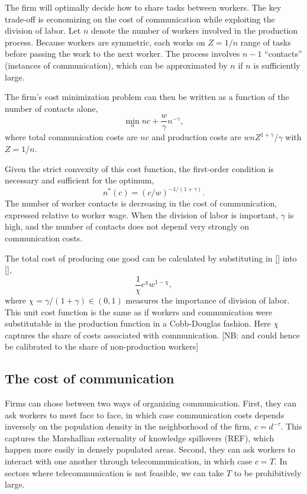 \documentclass[10pt,letterpaper]{article}
\begin{document}
The firm will optimally decide how to share tasks between workers. The key trade-off is economizing on the cost of communication while exploiting the division of labor. Let $n$ denote the number of workers involved in the production process. Because workers are symmetric, each works on $Z=1/n$ range of tasks before passing the work to the next worker. The process involves $n-1$ ``contacts'' (instances of communication), which can be approximated by $n$ if $n$ is sufficiently large.

The firm's cost minimization problem can then be written as a function of the number of contacts alone,
\begin{equation}
	\min_n nc + \frac w\gamma n^{-\gamma},
\end{equation}
where total communication costs are $nc$ and production costs are $w n Z^{1+\gamma}/\gamma$ with $Z=1/n$.

Given the strict convexity of this cost function, the first-order condition is necessary and sufficient for the optimum,
\begin{equation}
	n^*(c) = (c/w)^{-1/(1+\gamma)}.
\end{equation}
The number of worker contacts is decreasing in the cost of communication, expressed relative to worker wage. When the division of labor is important, $\gamma$ is high, and the number of contacts does not depend very strongly on communication costs.

The total cost of producing one good can be calculated by substituting in \eqref{} into \eqref{},
\begin{equation}
	\frac1\chi c^{\chi}w^{1-\chi},
\end{equation}
where $\chi=\gamma/(1+\gamma)\in(0,1)$ measures the importance of division of labor. This unit cost function is the same as if workers and communication were substitutable in the production function in a Cobb-Douglas fashion. Here $\chi$ captures the share of costs associated with communication. [NB: and could hence be calibrated to the share of non-production workers]
\subsection{The cost of communication}
Firms can chose between two ways of organizing communication. First, they can ask workers to meet face to face, in which case communication costs depends inversely on the population density in the neighborhood of the firm, $c=d^{-\tau}$. This captures the Marshallian externality of knowledge spillovers (REF), which happen more easily in densely populated areas. Second, they can ask workers to  interact with one another through telecommunication, in which case $c=T$. In sectors where telecommunication is not feasible, we can take $T$ to be prohibitively large.
\end{document}
